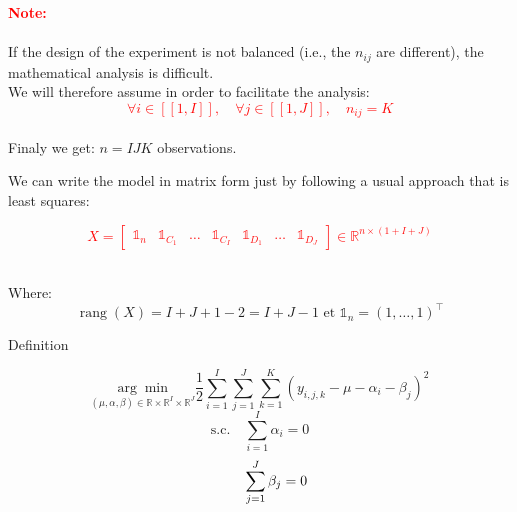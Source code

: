 \documentclass{beamer}
\begin{document}
\begin{frame}{}

 
\textcolor{red}{\textbf{Note:}} \\
\\
\vspace{0.5cm}If the design of the experiment is not balanced (i.e., the $n_{i j}$ are different), the mathematical analysis is difficult.\\
\vspace{0.3cm}
We will therefore assume in order to facilitate the analysis:
\textcolor{red}{$$\forall i \in[\![1, I]\!], \quad \forall j \in[\![1, J]\!], \quad n_{i j}=K $$}\\

Finaly we get: $n=IJK$ observations.
\end{frame}


\begin{frame}{}   
We can write the model in matrix form just by  following a usual approach that is least squares:\\

\begin{alertblock}{}
\vspace{1cm}
\textcolor{red}{$$X=\left[\begin{array}{lllllll}
\mathbb{1}_{n} & \mathbb{1}_{C_{1}} & \ldots & \mathbb{1}_{C_{I}} & \mathbb{1}_{D_{1}} & \ldots & \mathbb{1}_{D_{J}}
\end{array}\right] \in \mathbb{R}^{n \times(1+I+J)}$$}
\end{alertblock}\\
Where:\\
$$\operatorname{rang}(X)=I+J+1-2=I+J-1 \text { et } \mathbb{1}_{n}=(1, \ldots, 1)^{\top}$$

\end{frame}








\begin{frame}{Definition}
\begin{alertblock}{}
$$\underset{(\mu, \alpha, \beta) \in \mathbb{R} \times \mathbb{R}^{I} \times \mathbb{R}^{J}}{\arg \min } \frac{1}{2} \sum_{i=1}^{I} \sum_{j=1}^{J} \sum_{k=1}^{K}\left(y_{i, j, k}-\mu-\alpha_{i}-\beta_{j}\right)^{2}$$
$$\text {s.c.} \quad \sum_{i=1}^{I} \alpha_{i}=0$$
 $$\hspace{0.83cm} \sum_{j=1}^{J} \beta_{j}=0$$
\end{alertblock}
\end{frame}
\end{document}
